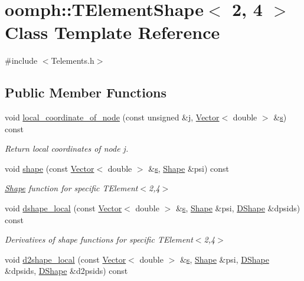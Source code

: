 \hypertarget{classoomph_1_1TElementShape_3_012_00_014_01_4}{}\section{oomph\+:\+:T\+Element\+Shape$<$ 2, 4 $>$ Class Template Reference}
\label{classoomph_1_1TElementShape_3_012_00_014_01_4}


{\ttfamily \#include $<$Telements.\+h$>$}

\subsection*{Public Member Functions}
\begin{DoxyCompactItemize}
\item 
void \hyperlink{classoomph_1_1TElementShape_3_012_00_014_01_4_a91216e39bba40b1a960db0d455465064}{local\+\_\+coordinate\+\_\+of\+\_\+node} (const unsigned \&j, \hyperlink{classoomph_1_1Vector}{Vector}$<$ double $>$ \&\hyperlink{cfortran_8h_ab7123126e4885ef647dd9c6e3807a21c}{s}) const
\begin{DoxyCompactList}\small\item\em Return local coordinates of node j. \end{DoxyCompactList}\item 
void \hyperlink{classoomph_1_1TElementShape_3_012_00_014_01_4_ac0523fd4dd569033f5eccaaaa75cb3d1}{shape} (const \hyperlink{classoomph_1_1Vector}{Vector}$<$ double $>$ \&\hyperlink{cfortran_8h_ab7123126e4885ef647dd9c6e3807a21c}{s}, \hyperlink{classoomph_1_1Shape}{Shape} \&psi) const
\begin{DoxyCompactList}\small\item\em \hyperlink{classoomph_1_1Shape}{Shape} function for specific T\+Element$<$2,4$>$ \end{DoxyCompactList}\item 
void \hyperlink{classoomph_1_1TElementShape_3_012_00_014_01_4_a709ab96252fdb823348a45eb707b1f52}{dshape\+\_\+local} (const \hyperlink{classoomph_1_1Vector}{Vector}$<$ double $>$ \&\hyperlink{cfortran_8h_ab7123126e4885ef647dd9c6e3807a21c}{s}, \hyperlink{classoomph_1_1Shape}{Shape} \&psi, \hyperlink{classoomph_1_1DShape}{D\+Shape} \&dpsids) const
\begin{DoxyCompactList}\small\item\em Derivatives of shape functions for specific T\+Element$<$2,4$>$ \end{DoxyCompactList}\item 
void \hyperlink{classoomph_1_1TElementShape_3_012_00_014_01_4_ad45219b60de75743d5f4e5154ab2c05e}{d2shape\+\_\+local} (const \hyperlink{classoomph_1_1Vector}{Vector}$<$ double $>$ \&\hyperlink{cfortran_8h_ab7123126e4885ef647dd9c6e3807a21c}{s}, \hyperlink{classoomph_1_1Shape}{Shape} \&psi, \hyperlink{classoomph_1_1DShape}{D\+Shape} \&dpsids, \hyperlink{classoomph_1_1DShape}{D\+Shape} \&d2psids) const
\end{DoxyCompactItemize}


